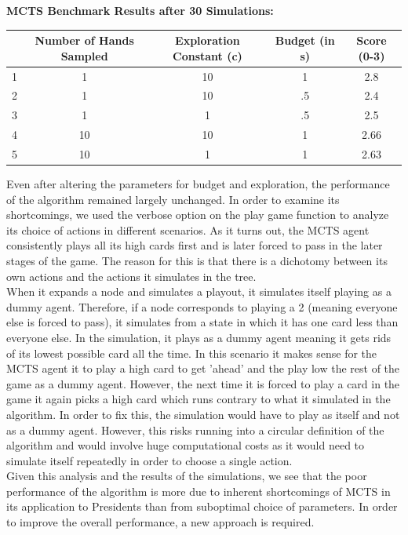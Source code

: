 \documentclass[11pt]{article}
\begin{document}
\begin{center}
\textbf{MCTS Benchmark Results after 30 Simulations:}\\
\begin{tabular}{ c|c|c|c|c } 
 \hline

  & Number of Hands Sampled & Exploration Constant (c) & Budget (in s) & Score  (0-3)\\ 
\hline
 1 & 1 & 10 &  1 & 2.8\\ 
 2 & 1& 10 & .5 & 2.4 \\
3 & 1 & 1 & .5 & 2.5\\
4 & 10 & 10 & 1 & 2.66 \\
5 & 10 & 1 & 1  & 2.63 \\
 \hline
\end{tabular}
\end{center}
Even after altering the parameters for budget and exploration, the performance of the algorithm remained largely unchanged. In order to examine its shortcomings, we used the verbose option on the play game function to analyze its choice of actions in different scenarios. As it turns out, the MCTS agent consistently plays all its high cards first and is later forced to pass in the later stages of the game. The reason for this is that there is a dichotomy between its own actions and the actions it simulates in the tree. \\

When it expands a node and simulates a playout, it simulates itself playing as a dummy agent. Therefore, if a node corresponds to playing a 2 (meaning everyone else is forced to pass), it simulates from a state in which it has one card less than everyone else. In the simulation, it plays as a dummy agent meaning it gets rids of its lowest possible card all the time. In this scenario it makes sense for the MCTS agent it to play a high card to get 'ahead' and the play low the rest of the game as a dummy agent. However, the next time it is forced to play a card in the game it again picks a high card which runs contrary to what it simulated in the algorithm. In order to fix this, the simulation would have to play as itself and not as a dummy agent. However, this risks running into a circular definition of the algorithm and would involve huge computational costs as it would need to simulate itself repeatedly in order to choose a single action.\\

Given this analysis and the results of the simulations, we see that the poor performance of the algorithm is more due to inherent shortcomings of MCTS in its application to Presidents than from suboptimal choice of parameters. In order to improve the overall performance, a new approach is required.
\end{document}
